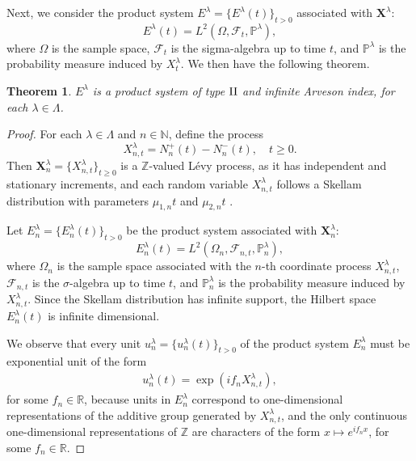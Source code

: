 \documentclass[11pt]{amsart}
\newtheorem{theorem}{Theorem}[section]
\theoremstyle{definition}
\theoremstyle{remark}
\numberwithin{equation}{section}
\newcommand{\m}{\mathcal }
\begin{document}
Next, we consider the product system \( E^\lambda = \{E^\lambda(t)\}_{t > 0} \) associated with \(\bm{X}^\lambda\):
\[
E^\lambda(t) = L^2(\Omega, \mathcal{F}_t, \mathbb{P}^\lambda),
\]
where \( \Omega \) is the sample space, \( \mathcal{F}_t \) is the sigma-algebra up to time \( t \), and \( \mathbb{P}^\lambda \) is the probability measure induced by \( X_t^\lambda \). We then have the following theorem.
\begin{theorem}\label{type}
\(E^\lambda\) is a product system of type \(\rm{II}\) and infinite Arveson index, for each \(\lambda\in \Lambda\).
\end{theorem}
\begin{proof}

 For each \(\lambda\in \Lambda \) and \(n\in\mathbb{N}\), define the process \[ 
 X_{n,t}^\lambda = N_n^+(t) - N_n^-(t),\quad t\geq 0. 
 \]  Then \(\bm{X}_n^\lambda=\{X_{n,t}^\lambda\}_{t\geq 0}\) is a \(\mathbb{Z}\)-valued L\'evy process, as it has independent and stationary increments, and each random variable \(X_{n,t}^\lambda\) follows a Skellam distribution with parameters \(\mu_{1,n}t\) and \(\mu_{2,n}t\) \cite{Skellam}. 
 
 Let  \(E^\lambda_n = \{E^\lambda_n(t)\}_{t > 0}\) be the product system associated with  \(\bm{X}_n^\lambda\):\[E_n^\lambda(t)=L^2(\Omega_n, \m{F}_{n,t}, \mathbb{P}_n^\lambda),\] where \(\Omega_n\) is the sample space associated with the \(n\)-th coordinate process \(X_{n,t}^\lambda\), \(\m{F}_{n,t}\) is the \(\sigma\)-algebra up to time \(t\), and \(\mathbb{P}_n^\lambda\) is the probability measure induced by \(X_{n,t}^\lambda\).  Since the Skellam distribution has infinite support, the Hilbert space \(E_n^\lambda(t)\) is infinite dimensional.

We observe that every unit \( u_n^\lambda=\{u_n^\lambda(t)\}_{t>0}\) of the product system \(E^\lambda_n\) must be exponential unit of the form \begin{eqnarray}\label{unitP}u_n^\lambda(t)=\exp(if_nX_{n,t}^\lambda),\end{eqnarray}
 for some \(f_n\in \mathbb{R}\), because units in \(E^\lambda_n\) correspond to one-dimensional representations of the additive group generated by \(X_{n,t}^\lambda\), and the only continuous one-dimensional representations of \(\mathbb{Z}\) are characters of the form  \(x\mapsto e^{if_nx}\), for some \(f_n\in \mathbb{R}\).


\end{proof}
\end{document}
